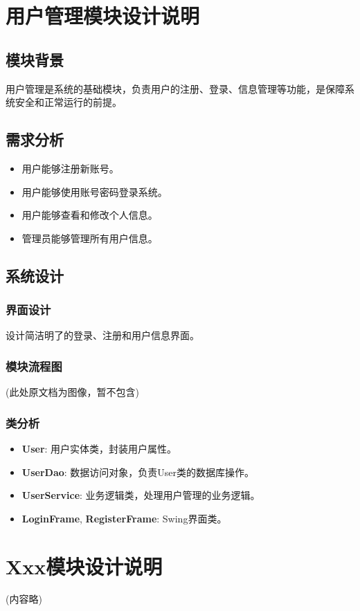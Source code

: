 \documentclass[a4paper]{ctexart}
\begin{document}
\section{用户管理模块设计说明}
\subsection{模块背景}
用户管理是系统的基础模块，负责用户的注册、登录、信息管理等功能，是保障系统安全和正常运行的前提。

\subsection{需求分析}
\begin{itemize}
    \item 用户能够注册新账号。
    \item 用户能够使用账号密码登录系统。
    \item 用户能够查看和修改个人信息。
    \item 管理员能够管理所有用户信息。
\end{itemize}

\subsection{系统设计}
\subsubsection{界面设计}
设计简洁明了的登录、注册和用户信息界面。
\subsubsection{模块流程图}
(此处原文档为图像，暂不包含)
\subsubsection{类分析}
\begin{itemize}
    \item \textbf{User}: 用户实体类，封装用户属性。
    \item \textbf{UserDao}: 数据访问对象，负责User类的数据库操作。
    \item \textbf{UserService}: 业务逻辑类，处理用户管理的业务逻辑。
    \item \textbf{LoginFrame}, \textbf{RegisterFrame}: Swing界面类。
\end{itemize}

\section{Xxx模块设计说明}
 (内容略)
\end{document}
